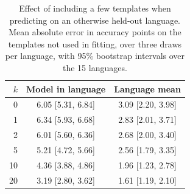 \begin{table}[t]
\centering
\small
\begin{tabular}{rcc}
\hline
$k$ & Model in language & Language mean \\
\hline
0 & 6.05 [5.31, 6.84] & 3.09 [2.20, 3.98] \\
1 & 6.34 [5.93, 6.68] & 2.83 [2.01, 3.71] \\
2 & 6.01 [5.60, 6.36] & 2.68 [2.00, 3.40] \\
5 & 5.21 [4.72, 5.66] & 2.56 [1.79, 3.35] \\
10 & 4.36 [3.88, 4.86] & 1.96 [1.23, 2.78] \\
20 & 3.19 [2.80, 3.62] & 1.61 [1.19, 2.10] \\
\hline
\end{tabular}
\caption{Effect of including a few templates when predicting on an otherwise held-out language. Mean absolute error in accuracy points on the templates not used in fitting, over three draws per language, with 95\% bootstrap intervals over the 15 languages.}
\label{tab:fewshot}
\end{table}
